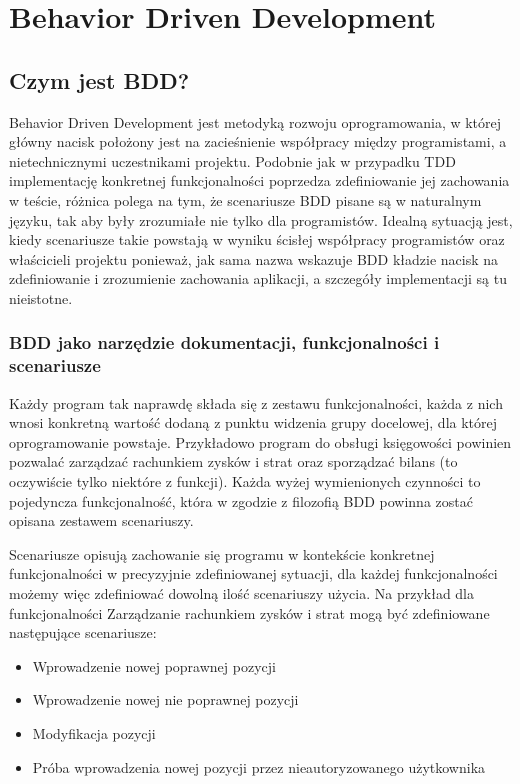 \chapter[Behavior Driven Development]{Behavior Driven Development}
  \section{Czym jest BDD?}
    Behavior Driven Development jest metodyką rozwoju oprogramowania, w której główny nacisk położony jest na zacieśnienie współpracy między programistami, a nietechnicznymi uczestnikami projektu. Podobnie jak w przypadku TDD implementację konkretnej funkcjonalności poprzedza zdefiniowanie jej zachowania w teście, różnica polega na tym, że scenariusze BDD pisane są w naturalnym języku, tak aby były zrozumiałe nie tylko dla programistów. Idealną sytuacją jest, kiedy scenariusze takie powstają w wyniku ścisłej współpracy programistów oraz właścicieli projektu ponieważ, jak sama nazwa wskazuje BDD kładzie nacisk na zdefiniowanie i zrozumienie zachowania aplikacji, a szczegóły implementacji są tu nieistotne.
    \subsection{BDD jako narzędzie dokumentacji, funkcjonalności i scenariusze}
      Każdy program tak naprawdę składa się z zestawu funkcjonalności, każda z nich wnosi konkretną wartość dodaną z punktu widzenia grupy docelowej, dla której oprogramowanie powstaje. Przykładowo program do obsługi księgowości powinien pozwalać zarządzać rachunkiem zysków i strat oraz sporządzać bilans (to oczywiście tylko niektóre z funkcji). Każda wyżej wymienionych czynności to pojedyncza funkcjonalność, która w zgodzie z filozofią BDD powinna zostać opisana zestawem scenariuszy.
      
      Scenariusze opisują zachowanie się programu w kontekście konkretnej funkcjonalności w precyzyjnie zdefiniowanej sytuacji, dla każdej funkcjonalności możemy więc zdefiniować dowolną ilość scenariuszy użycia. Na przykład dla funkcjonalności Zarządzanie rachunkiem zysków i strat mogą być zdefiniowane następujące scenariusze:
      
      \begin{itemize}
        \item Wprowadzenie nowej poprawnej pozycji
        \item Wprowadzenie nowej nie poprawnej pozycji
        \item Modyfikacja pozycji
        \item Próba wprowadzenia nowej pozycji przez nieautoryzowanego użytkownika
      \end{itemize}
      
